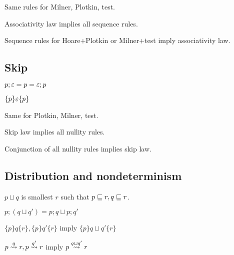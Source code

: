 \documentclass{article}
\begin{document}
Same rules for Milner, Plotkin, test.

\begin{theorem}
Associativity law implies all sequence rules.
\end{theorem}

\begin{theorem}
Sequence rules for Hoare+Plotkin or Milner+test imply associativity law.
\end{theorem}


\subsection*{Skip}

\begin{law}[Skip]
$p;\varepsilon = p = \varepsilon;p$
\end{law}

\begin{rul}
$\{p\}\varepsilon\{p\}$
\end{rul}

Same for Plotkin, Milner, test.

\begin{theorem}
Skip law implies all nullity rules.
\end{theorem}

\begin{theorem}
Conjunction of all nullity rules implies skip law.
\end{theorem}


\subsection*{Distribution and nondeterminism}

\begin{definition}[$\sqcup$]
$p \sqcup q$ is smallest $r$ such that $p \sqsubseteq r, q \sqsubseteq r$.
\end{definition}

\begin{law}
$p; (q \sqcup q') = p;q \sqcup p;q'$
\end{law}

\begin{rul}
$\{p\}q\{r\}, \{p\}q'\{r\}$ imply $\{p\}q\sqcup q'\{r\}$
\end{rul}

\begin{rul}
$p \stackrel{q}{\leadsto} r, p \stackrel{q'}{\leadsto} r$ imply $p \stackrel{q\sqcup q'}{\leadsto} r$
\end{rul}
\end{document}
